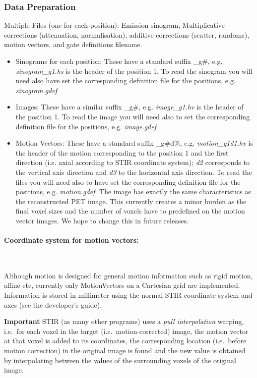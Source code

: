 \documentclass{article}
\newcommand{\subsubsubsection}[1]{\paragraph{#1}\mbox{} \\}
\begin{document}
{\subsubsection{Data Preparation}

Multiple
Files (one for each position): Emission sinogram, Multiplicative corrections
(attenuation, normalisation), additive corrections (scatter, randoms), motion
vectors, and gate definitions filename.

\begin{itemize}
\item Sinograms for each position: 
These have a standard suffix \_g\#, e.g. \textit{sinogram\_g1.hs} is the header of the
position 1. To read the sinogram you will need also have set the corresponding
definition file for the positions, e.g. \textit{sinogram.gdef}

\item Images:
These have a similar suffix \_g\#, e.g. \textit{image\_g1.hv} is the header of the
position 1. To read the image you will need also to set the corresponding
definition file for the positions, e.g. \textit{image.gdef}

\item Motion Vectors:
These have a standard suffix \_g\#d\%, e.g. \textit{motion\_g1d1.hv} is the header of the motion
corresponding to the position 1 and the first direction (i.e. axial according
to STIR coordinate system); \textit{d2} corresponds to the vertical axis
direction and \textit{d3} to the horizontal axis direction. To read the files you
will need also to have set the corresponding definition file for the positions,
e.g. \textit{motion.gdef}. The image has exactly the same characteristics as the
reconstructed PET image. This currently creates a minor burden as the final
voxel sizes and the number of voxels have to predefined on the motion vector
images. We hope to change this in future releases. 
\end{itemize}

{\subsubsubsection{Coordinate system for motion vectors: }}

Although motion is designed for general motion
information such as rigid motion, affine etc, currently only MotionVectors on a
Cartesian grid are implemented. Information is stored in millimeter using the normal
STIR coordinate system and axes (see the developer's guide).

\textbf{Important} STIR (as many other programs) uses a 
\textit{pull interpolation} warping, i.e.\ for each voxel in the target
(i.e.\ motion-corrected) image, the motion vector
at that voxel is added to its coordinates, the corresponding location (i.e.\ before motion correction)
in the original image is found and the new value is obtained by interpolating 
between the values of the surrounding voxels of the original image.

}
\end{document}
